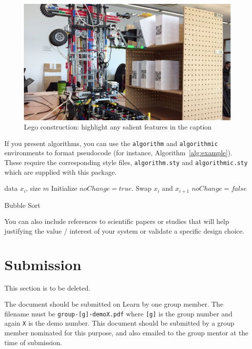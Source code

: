 \documentclass{article}
\begin{document}
\begin{figure}[tb]
\vskip 5mm
\begin{center}
\centerline{\includegraphics[width=\columnwidth]{figs/crane}}
\caption{Lego construction: highlight any salient features in the caption}
\label{fig:sample-fig}
\end{center}
\vskip -5mm
\end{figure} 

If you present algorithms, you can use the \verb+algorithm+ and \verb+algorithmic+ environments to format pseudocode (for instance, Algorithm~\ref{alg:example}). These require the corresponding style files, \verb+algorithm.sty+ and \verb+algorithmic.sty+ which are supplied with this package. 

\begin{algorithm}[ht]
\begin{algorithmic}
    data $x_i$, size $m$
   \REPEAT
   \STATE Initialize $noChange = true$.
   \STATE Swap $x_i$ and $x_{i+1}$
   \STATE $noChange = false$
   \ENDIF
   \ENDFOR
\end{algorithmic}
  \caption{Bubble Sort}
  \label{alg:example}
\end{algorithm}

You can also include references to scientific papers \cite{langley00} or studies that will help justifying the value / interest of your system or validate a specific design choice.

\section*{Submission}
This section is to be deleted.

The document should be submitted on Learn by one group member.
The filename must be  \verb|group-[g]-demoX.pdf| where \verb|[g]| is the group number and again  \verb|X| is the demo number.
This document should be submitted by a group member nominated for this purpose, and also emailed to the group mentor at the time of submission.
\end{document}

